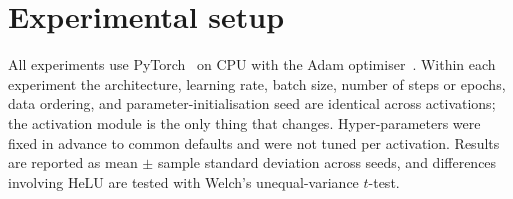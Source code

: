 \documentclass[11pt]{article}
\begin{document}
\section{Experimental setup}
\label{sec:setup}

All experiments use PyTorch~\citep{paszke2019pytorch} on CPU with the Adam
optimiser~\citep{kingma2015adam}. Within each experiment the architecture, learning rate, batch size,
number of steps or epochs, data ordering, and parameter-initialisation seed are identical across
activations; the activation module is the only thing that changes. Hyper-parameters were fixed in
advance to common defaults and were not tuned per activation. Results are reported as mean $\pm$
sample standard deviation across seeds, and differences involving HeLU are tested with Welch's
unequal-variance $t$-test.
\end{document}
